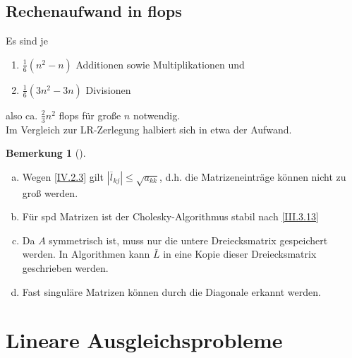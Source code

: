 \documentclass[ngerman,fontsize=11pt, paper=a4, parskip=half, titlepage=true, toc=bib]{scrbook}
\theoremstyle{definition}
\newtheorem{Bem}[Def]{Bemerkung}	%
\theoremstyle{plain}
\newcommand{\sectione}[1]{ \setcounter{equation}{0}\section{#1}}
\newcommand{\subsectione}[1]{\addtocounter{Def}{1}\subsection{#1}}
\newenvironment{Beme}[1][]{ %
	\begin{Bem}[#1]
	}
	{
	\end{Bem}
	\addtocounter{subsection}{1}
}
\begin{document}
  
  
  \subsectione{Rechenaufwand in flops}
  Es sind je 
  \begin{enumerate}
  \item[] $\frac{1}{6}(n^2-n) $ Additionen sowie Multiplikationen und 
  \item[]  $\frac{1}{6}(3n^2-3n) $ Divisionen 
  \end{enumerate}
  also ca. $\frac{2}{3} n^2$ flops für große $n$ notwendig. \\
  Im Vergleich zur LR-Zerlegung halbiert sich in etwa der Aufwand.
  
\begin{Beme}~
	\begin{enumerate}[a)]
		\item Wegen \eqref{IV.2.3} gilt $|\overline{l}_{kj}| \leq \sqrt{a_{kk}}$,
		d.h. die Matrizeneinträge können nicht zu groß werden.
		\item Für spd Matrizen ist der Cholesky-Algorithmus stabil nach \eqref{III.3.13}
		\item Da $A$ symmetrisch ist, muss nur die untere Dreiecksmatrix gespeichert werden.
		In Algorithmen kann $\bar{L}$ in eine Kopie dieser Dreiecksmatrix geschrieben werden.
		\item Fast singuläre Matrizen können durch die Diagonale erkannt werden.
	\end{enumerate}
\end{Beme}
  
  
  \sectione{Lineare Ausgleichsprobleme} 
  
\end{document}
